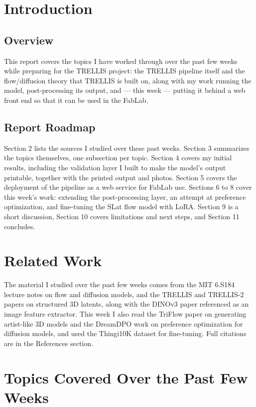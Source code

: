 \documentclass[11pt,a4paper]{article}
\begin{document}
\newpage
\tableofcontents
\newpage


\section{Introduction}
\subsection{Overview}
This report covers the topics I have worked through over the past few weeks while preparing for the TRELLIS project: the TRELLIS pipeline itself and the flow/diffusion theory that TRELLIS is built on, along with my work running the model, post-processing its output, and --- this week --- putting it behind a web front end so that it can be used in the FabLab.

\subsection{Report Roadmap}
Section 2 lists the sources I studied over these past weeks. Section 3 summarizes the topics themselves, one subsection per topic. Section 4 covers my initial results, including the validation layer I built to make the model's output printable, together with the printed output and photos. Section 5 covers the deployment of the pipeline as a web service for FabLab use. Sections 6 to 8 cover this week's work: extending the post-processing layer, an attempt at preference optimization, and fine-tuning the SLat flow model with LoRA. Section 9 is a short discussion, Section 10 covers limitations and next steps, and Section 11 concludes.


\section{Related Work}
The material I studied over the past few weeks comes from the MIT 6.S184 lecture notes on flow and diffusion models, and the TRELLIS and TRELLIS-2 papers on structured 3D latents, along with the DINOv3 paper referenced as an image feature extractor. This week I also read the TriFlow paper on generating artist-like 3D models and the DreamDPO work on preference optimization for diffusion models, and used the Thingi10K dataset for fine-tuning. Full citations are in the References section.


\section{Topics Covered Over the Past Few Weeks}
\end{document}
